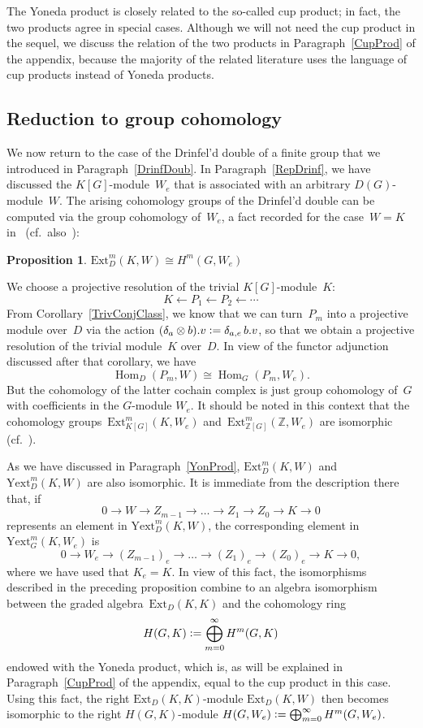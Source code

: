 \documentclass[12pt]{article}
\makeatletter
\theoremstyle{definition}
\newtheorem{Proposition}[Satz]{Proposition}
\theoremstyle{break}
\renewenvironment{proof}[1][\proofname]{\par
\vspace{-5pt}%
\pushQED{\qed}%
\normalfont
\topsep0pt \partopsep0pt %
\trivlist
\item[\hskip\labelsep
\bfseries
#1\@addpunct{.}]\ignorespaces
}{%
\popQED\endtrivlist\@endpefalse
\addvspace{6pt plus 6pt} %
}
\newcommand{\Z}{\mathbb{Z}}
\DeclareMathOperator\Hom{Hom}
\newcommand{\Ext}{\mathrm{Ext}}
\newcommand{\Yext}{\mathrm{Yext}}
\renewcommand{\1}{\mathbbm{1}}
\newcommand{\ot}{\mathbin{\otimes}}
\newcommand{\deq}{\vcentcolon =}
\makeatother
\begin{document}
The Yoneda product is closely related to the so-called cup product; in fact, the two products agree in special cases. Although we will not need the cup product in the sequel, we discuss the relation of the two products in Paragraph~\ref{CupProd} of the appendix, because the majority of the related literature uses the language of cup products instead of Yoneda products.


\subsection{Reduction to group cohomology} \label{RedGroupCohom}
We now return to the case of the Drinfel'd double of a finite group that we introduced in Paragraph~\ref{DrinfDoub}. In Paragraph~\ref{RepDrinf}, we have discussed the $K[G]$-module~$W_e$ that is associated with an arbitrary $D(G)$-module~$W$. The arising cohomology groups of the Drinfel'd double can be computed via the group cohomology of~$W_e$, a fact recorded for the case~$W=K$ in~\cite[Lem.~1.3, p.~311]{W1} (cf.~also~\cite[Chap.~IV, Sec.~12, Eq.~(12.1), p.~163]{HiS}):
\begin{Proposition} \label{GroupCohom}
$\Ext_D^m(K, W) \cong H^m(G, W_e)$
\end{Proposition}
\begin{proof}
We choose a projective resolution of the trivial $K[G]$-module~$K$:
\[K \longleftarrow P_1 \longleftarrow P_2 \longleftarrow \cdots \]
From Corollary~\ref{TrivConjClass}, we know that we can turn~$P_m$ into a projective module over~$D$ via the action $(\delta_a \ot b).v \deq \delta_{a,e} \, b.v$, so that we obtain a projective resolution of the trivial module~$K$ over~$D$. In view of the functor adjunction discussed after that corollary, we have
\[\Hom_{D}(P_m, W) \cong \Hom_G(P_m, W_e).\]
But the cohomology of the latter cochain complex is just group cohomology of~$G$ with coefficients in the $G$-module $W_e$. It should be noted in this context that the cohomology groups~$\Ext_{K[G]}^m(K, W_e)$ and~$\Ext_{\Z[G]}^m(\Z, W_e)$ are isomorphic (cf.~\cite[Sec.~1.1, p.~3]{E}).
\end{proof}

As we have discussed in Paragraph~\ref{YonProd}, $\Ext_D^m(K, W)$ and $\Yext_D^m(K, W)$ are also isomorphic. It is immediate from the description there that, if
\[0 \to W \to Z_{m-1} \to \dots \to Z_1 \to Z_0 \to K \to 0\]
represents an element in $\Yext_D^m(K, W)$, the corresponding element in
$\Yext_G^m(K, W_e)$ is
\[0 \to W_e \to (Z_{m-1})_e \to \dots \to (Z_1)_e \to (Z_0)_e \to K \to 0,\]
where we have used that $K_e=K$. In view of this fact, the isomorphisms described in the preceding proposition combine to an algebra isomorphism between the graded algebra~$\Ext_D(K, K)$ and the cohomology ring
\[H(G, K) \deq \bigoplus_{m=0}^\infty H^m(G, K)\]
endowed with the Yoneda product, which is, as will be explained in Paragraph~\ref{CupProd} of the appendix, equal to the cup product in this case. Using this fact, the right $\Ext_D(K, K)$-module $\Ext_D(K, W)$ then becomes isomorphic to the right $H(G, K)$-module $H(G, W_e) \deq \bigoplus_{m=0}^\infty H^m(G, W_e)$.
\end{document}
